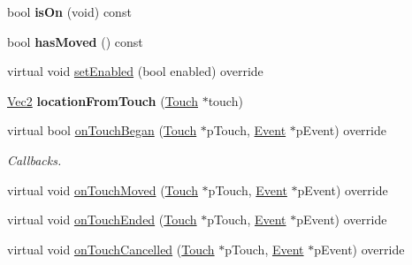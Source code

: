 \begin{DoxyCompactItemize}
\item 
\mbox{\label{classControlSwitch_ad4af475419ce4aa3e0596aac747d0939}} 
bool {\bfseries is\+On} (void) const
\item 
\mbox{\label{classControlSwitch_a7bd98521bbf0a04f1a8430a16909f2c6}} 
bool {\bfseries has\+Moved} () const
\item 
virtual void \hyperlink{classControlSwitch_a47191d986db5cb5c95a7b2171d483784}{set\+Enabled} (bool enabled) override
\item 
\mbox{\label{classControlSwitch_aa8cbcfac92dc02724eb12811395f3a2f}} 
\hyperlink{classVec2}{Vec2} {\bfseries location\+From\+Touch} (\hyperlink{classTouch}{Touch} $\ast$touch)
\item 
virtual bool \hyperlink{classControlSwitch_aaba407c9125d0e4cc85fb5ae59ea964c}{on\+Touch\+Began} (\hyperlink{classTouch}{Touch} $\ast$p\+Touch, \hyperlink{classEvent}{Event} $\ast$p\+Event) override
\begin{DoxyCompactList}\small\item\em Callbacks. \end{DoxyCompactList}\item 
virtual void \hyperlink{classControlSwitch_a74c30d86ef910e4ee32a413153e74042}{on\+Touch\+Moved} (\hyperlink{classTouch}{Touch} $\ast$p\+Touch, \hyperlink{classEvent}{Event} $\ast$p\+Event) override
\item 
virtual void \hyperlink{classControlSwitch_a6976aba81f0846eb827114efc06301d3}{on\+Touch\+Ended} (\hyperlink{classTouch}{Touch} $\ast$p\+Touch, \hyperlink{classEvent}{Event} $\ast$p\+Event) override
\item 
virtual void \hyperlink{classControlSwitch_a31cc47f044081bb65d8490ac1b8900c0}{on\+Touch\+Cancelled} (\hyperlink{classTouch}{Touch} $\ast$p\+Touch, \hyperlink{classEvent}{Event} $\ast$p\+Event) override
\end{DoxyCompactItemize}
